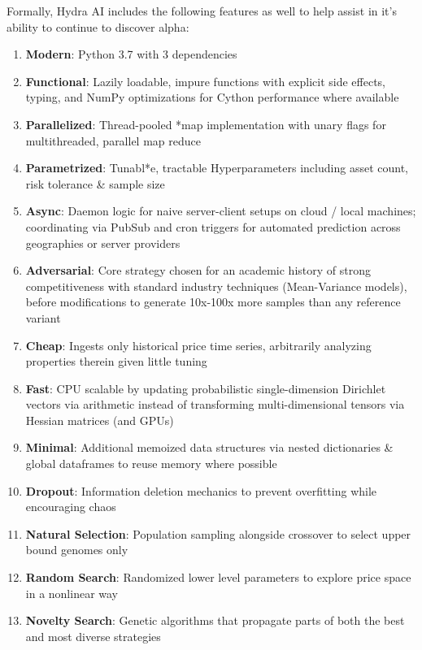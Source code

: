 \documentclass[11pt, a4paper]{awesome-cv}
\begin{document}
\begin{cvletter}
Formally, Hydra AI includes the following features as well to help assist in
it's ability to continue to discover alpha:
\begin{enumerate}
\item \textbf{\textbf{Modern}}: Python 3.7 with 3 dependencies
\item \textbf{\textbf{Functional}}: Lazily loadable, impure functions with explicit side effects, typing, and NumPy optimizations for Cython performance where available \item \textbf{\textbf{Parallelized}}: Thread-pooled *map implementation with unary flags for multithreaded, parallel map reduce
\item \textbf{\textbf{Parametrized}}: Tunabl*e, tractable Hyperparameters including asset count, risk tolerance \& sample size
\item \textbf{\textbf{Async}}: Daemon logic for naive server-client setups on cloud / local machines; coordinating via PubSub and cron triggers for automated prediction across geographies or server providers
\item \textbf{\textbf{Adversarial}}: Core strategy chosen for an academic history of strong competitiveness with standard industry techniques (Mean-Variance models), before modifications to generate 10x-100x more samples than any reference variant
\item \textbf{\textbf{Cheap}}: Ingests only historical price time series, arbitrarily analyzing properties therein given little tuning
\item \textbf{\textbf{Fast}}: CPU scalable by updating probabilistic single-dimension Dirichlet vectors via arithmetic instead of transforming multi-dimensional tensors via Hessian matrices (and GPUs)
\item \textbf{\textbf{Minimal}}: Additional memoized data structures via nested dictionaries \& global dataframes to reuse memory where possible
\item \textbf{\textbf{Dropout}}: Information deletion mechanics to prevent overfitting while encouraging chaos
\item \textbf{\textbf{Natural Selection}}: Population sampling alongside crossover to select upper bound genomes only
\item \textbf{\textbf{Random Search}}: Randomized lower level parameters to explore price space in a nonlinear way
\item \textbf{\textbf{Novelty Search}}: Genetic algorithms that propagate parts of both the best and most diverse strategies
\end{enumerate}


\end{cvletter}
\end{document}
